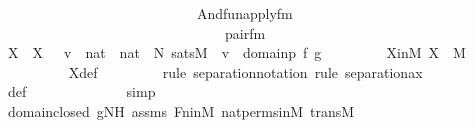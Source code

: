 \begin{isabellebody}
\ \ \ \ \ \ \ \ \ \ \ \ \ \ \ \ \ \ \ \ \ \ \ \ \ \ \ \ And{\isacharparenleft}{\kern0pt}fun{\isacharunderscore}{\kern0pt}apply{\isacharunderscore}{\kern0pt}fm{\isacharparenleft}{\kern0pt}{}{\isacharcomma}{\kern0pt}\ {}{\isacharcomma}{\kern0pt}\ {}{\isacharparenright}{\kern0pt}{\isacharcomma}{\kern0pt}\ \isanewline
\ \ \ \ \ \ \ \ \ \ \ \ \ \ \ \ \ \ \ \ \ \ \ \ \ \ \ \ \ \ \ \ pair{\isacharunderscore}{\kern0pt}fm{\isacharparenleft}{\kern0pt}{}{\isacharcomma}{\kern0pt}\ {}{\isacharcomma}{\kern0pt}\ {}{\isacharparenright}{\kern0pt}{\isacharparenright}{\kern0pt}{\isacharparenright}{\kern0pt}{\isacharparenright}{\kern0pt}{\isacharparenright}{\kern0pt}{\isacharparenright}{\kern0pt}{\isacharparenright}{\kern0pt}{\isacharparenright}{\kern0pt}{\isacharparenright}{\kern0pt}{\isacharparenright}{\kern0pt}{\isacharparenright}{\kern0pt}{\isacharparenright}{\kern0pt}{\isachardoublequoteclose}\ \ \isanewline
\ \ \ \ \ \ \isamarkupfalse%
\ X\ \ {\isachardoublequoteopen}X\ {\isasymequiv}\ {\isacharbraceleft}{\kern0pt}\ v\ {\isasymin}\ {\isacharparenleft}{\kern0pt}nat\ {\isasymtimes}\ nat{\isacharparenright}{\kern0pt}\ {\isasymtimes}\ N{\isachardot}{\kern0pt}\ sats{\isacharparenleft}{\kern0pt}M{\isacharcomma}{\kern0pt}\ {\isasymphi}{\isacharcomma}{\kern0pt}\ {\isacharbrackleft}{\kern0pt}v{\isacharbrackright}{\kern0pt}\ {\isacharat}{\kern0pt}\ {\isacharbrackleft}{\kern0pt}domain{\isacharparenleft}{\kern0pt}p{\isacharparenright}{\kern0pt}{\isacharcomma}{\kern0pt}\ f{\isacharcomma}{\kern0pt}\ g{\isacharbrackright}{\kern0pt}{\isacharparenright}{\kern0pt}\ {\isacharbraceright}{\kern0pt}{\isachardoublequoteclose}\isanewline
\isanewline
\ \ \ \ \ \ \isamarkupfalse%
\ XinM{\isacharcolon}{\kern0pt}\ {\isachardoublequoteopen}X\ {\isasymin}\ M{\isachardoublequoteclose}\ \isanewline
\ \ \ \ \ \ \ \ \isamarkupfalse%
\ X{\isacharunderscore}{\kern0pt}def\isanewline
\ \ \ \ \ \ \ \ \isamarkupfalse%
{\isacharparenleft}{\kern0pt}rule\ separation{\isacharunderscore}{\kern0pt}notation{\isacharcomma}{\kern0pt}\ rule\ separation{\isacharunderscore}{\kern0pt}ax{\isacharparenright}{\kern0pt}\isanewline
\ \ \ \ \ \ \ \ \isamarkupfalse%
\ {\isasymphi}{\isacharunderscore}{\kern0pt}def\ \isanewline
\ \ \ \ \ \ \ \ \ \ \ \isamarkupfalse%
\ simp\isanewline
\ \ \ \ \ \ \ \ \isamarkupfalse%
\ domain{\isacharunderscore}{\kern0pt}closed\ gNH\ assms\ Fn{\isacharunderscore}{\kern0pt}in{\isacharunderscore}{\kern0pt}M\ nat{\isacharunderscore}{\kern0pt}perms{\isacharunderscore}{\kern0pt}in{\isacharunderscore}{\kern0pt}M\ transM\ \isanewline

\end{isabellebody}

